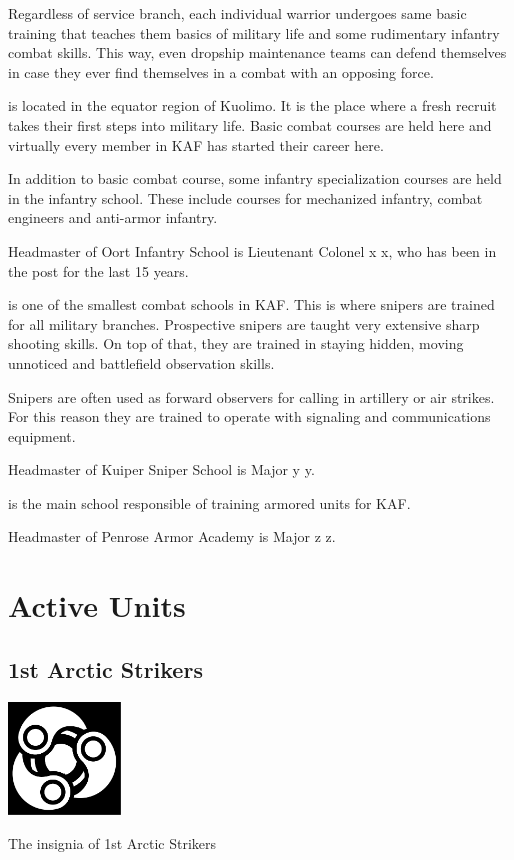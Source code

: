 \documentclass{tufte-book}
\begin{document}
Regardless of service branch, each individual warrior undergoes same basic
training that teaches them basics of military life and some rudimentary
infantry combat skills. This way, even dropship maintenance teams can defend
themselves in case they ever find themselves in a combat with an opposing
force.

 is located in the equator region of Kuolimo.
It is the place where a fresh recruit takes their first steps into military
life. Basic combat courses are held here and virtually every member in KAF
has started their career here.

In addition to basic combat course, some infantry specialization courses are
held in the infantry school. These include courses for mechanized infantry,
combat engineers and anti-armor infantry.

Headmaster of Oort Infantry School is Lieutenant Colonel x x,
who has been in the post for the last 15 years.

 is one of the smallest combat schools in KAF.
This is where snipers are trained for all military branches. Prospective
snipers are taught very extensive sharp shooting skills. On top of that, they
are trained in staying hidden, moving unnoticed and battlefield observation
skills.

Snipers are often used as forward observers for calling in artillery or air
strikes. For this reason they are trained to operate with signaling and
communications equipment.

Headmaster of Kuiper Sniper School is Major y y.

 is the main school responsible of training
armored units for KAF.

Headmaster of Penrose Armor Academy is Major z z.

\chapter{Active Units}
\label{ch:active_units}

\section{1st Arctic Strikers}
\label{sc:arctic_strikers}

\begin{marginfigure}[0\baselineskip]
  \includegraphics[width=3cm]{triple-yin}
  \caption{The insignia of 1st Arctic Strikers}
  \label{fig:arctic_strikers}
\end{marginfigure}
\end{document}
